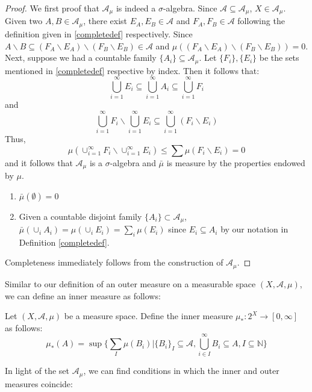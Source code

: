 \documentclass[main.tex]{subfiles}
\begin{document}
\begin{proof}
We first proof that $\mathcal{A}_{\mu}$ is indeed a $\sigma$-algebra. Since $\mathcal{A} \subseteq \mathcal{A}_{\mu}$, $X \in \mathcal{A}_{\mu}$. Given two $A,B \in \mathcal{A}_{\mu}$, there exist $E_A,E_B \in \mathcal{A}$ and $F_A,F_B \in \mathcal{A}$ following the definition given in \ref{completedef} respectively. Since $A\backslash B \subseteq (F_A \backslash E_A) \backslash (F_B \backslash E_B) \in \mathcal{A}$ and $\mu((F_A \backslash E_A) \backslash (F_B \backslash E_B)) = 0$. Next, suppose we had a countable family $\{A_i\} \subseteq  \mathcal{A}_{\mu}$.
Let $\{F_i\},\{E_i\}$ be the sets mentioned in \ref{completedef} respective by index. Then it follows that: 
$$ \bigcup_{i = 1}^{\infty} E_i \subseteq \bigcup_{i = 1}^{\infty} A_i\subseteq \bigcup_{i = 1}^{\infty} F_i$$ and 
$$\bigcup_{i = 1}^{\infty} F_i \backslash  \bigcup_{i = 1}^{\infty} E_i \subseteq \bigcup_{i = 1}^{\infty} (F_i \backslash E_i) $$ 
Thus,
$$ \mu(\cup_{i = 1}^{\infty} F_i \backslash  \cup_{i = 1}^{\infty} E_i ) \leq \sum \mu(F_i\backslash E_i) = 0 $$
and it follows that $\mathcal{A}_{\mu}$ is a $\sigma$-algebra and $\bar{\mu}$ is measure by the properties endowed by $\mu$. 

\begin{enumerate}
 \item $\bar{\mu}(\emptyset) = 0$
 \item Given a countable disjoint family $\{A_i\} \subset \mathcal{A}_{\mu}$,
 $\bar{\mu}(\cup_i A_i) = \mu(\cup_i E_i) = \sum_i \mu(E_i)$ since $E_i \subseteq A_i$ by our notation in Definition \ref{completedef}.
\end{enumerate}

Completeness immediately follows from the construction of $\mathcal{A}_{\mu}$.
\end{proof}

Similar to our definition of an outer measure on a measurable space $(X,\mathcal{A},\mu)$, we can define an inner measure as follows:

\begin{definition}
 Let $(X,\mathcal{A},\mu)$ be a measure space. Define the inner measure 
 $\mu_*: 2^X \rightarrow [0,\infty]$ as follows:
 $$ \mu_*(A) = \sup \{ \sum_I \mu(B_i) \vert \{B_i\}_I \subseteq \mathcal{A}, \bigcup_{i \in I}^{\infty} B_i \subseteq A, I \subseteq \mathbb{N} \}$$
\end{definition}

In light of the set $\mathcal{A}_{\mu}$, we can find conditions in which the inner and outer measures coincide:
\end{document}
